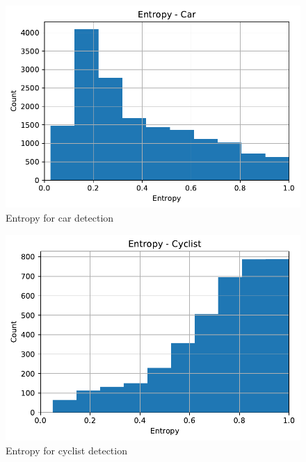 \documentclass[10pt,twocolumn,letterpaper]{article}
\begin{document}
\begin{figure}[!htbp]
        \centering
		\includegraphics[scale = 0.4]{./images/Part-Bayesian F_Pointnet_Results/Entropy_Car.pdf}
        \caption[Extracted frustum point cloud after Normalization]{Entropy for car detection}
        \label{fig:Car_Entropy}
\end{figure}
\begin{figure}[!htbp]
        \centering
		\includegraphics[scale = 0.4]{images/Part-Bayesian F_Pointnet_Results/Entropy_Cyclist.pdf}
        \caption[Extracted frustum point cloud after Normalization]{Entropy for cyclist detection}
        \label{fig:Cyclist_Entropy}
\end{figure}
\end{document}
